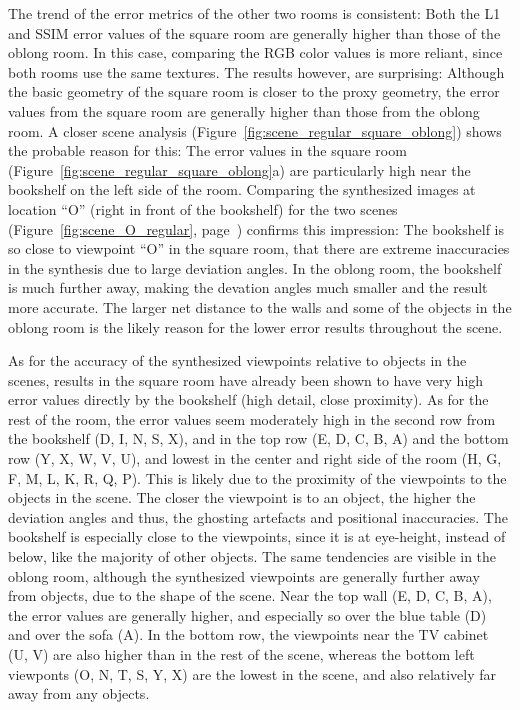 The trend of the error metrics of the other two rooms is consistent: Both the L1 and SSIM error values of the square room are generally higher than those of the oblong room. In this case, comparing the RGB color values is more reliant, since both rooms use the same textures. The results however, are surprising: Although the basic geometry of the square room is closer to the proxy geometry, the error values from the square room are generally higher than those from the oblong room.
A closer scene analysis (Figure~\ref{fig:scene_regular_square_oblong}) shows the probable reason for this: The error values in the square room (Figure~\ref{fig:scene_regular_square_oblong}a) are particularly high near the bookshelf on the left side of the room. Comparing the synthesized images at location ``O'' (right in front of the bookshelf) for the two scenes (Figure~\ref{fig:scene_O_regular}, page~\pageref{fig:scene_O_regular}) confirms this impression: The bookshelf is so close to viewpoint ``O'' in the square room, that there are extreme inaccuracies in the synthesis due to large deviation angles. In the oblong room, the bookshelf is much further away, making the devation angles much smaller and the result more accurate. The larger net distance to the walls and some of the objects in the oblong room is the likely reason for the lower error results throughout the scene.

As for the accuracy of the synthesized viewpoints relative to objects in the scenes, results in the square room have already been shown to have very high error values directly by the bookshelf (high detail, close proximity). As for the rest of the room, the error values seem moderately high in the second row from the bookshelf (D, I, N, S, X), and in the top row (E, D, C, B, A) and the bottom row (Y, X, W, V, U), and lowest in the center and right side of the room (H, G, F, M, L, K, R, Q, P). This is likely due to the proximity of the viewpoints to the objects in the scene. The closer the viewpoint is to an object, the higher the deviation angles and thus, the ghosting artefacts and positional inaccuracies. The bookshelf is especially close to the viewpoints, since it is at eye-height, instead of below, like the majority of other objects.
The same tendencies are visible in the oblong room, although the synthesized viewpoints are generally further away from objects, due to the shape of the scene. Near the top wall (E, D, C, B, A), the error values are generally higher, and especially so over the blue table (D) and over the sofa (A). In the bottom row, the viewpoints near the TV cabinet (U, V) are also higher than in the rest of the scene, whereas the bottom left viewponts (O, N, T, S, Y, X) are the lowest in the scene, and also relatively far away from any objects.


